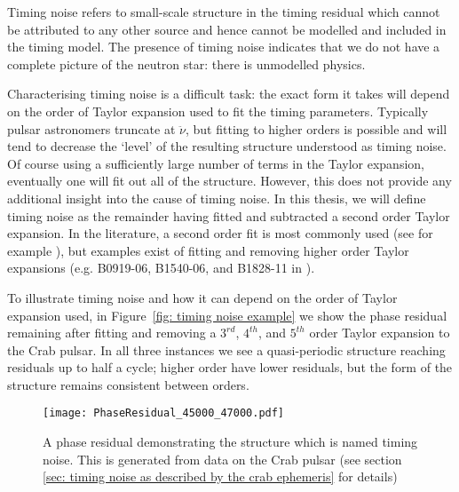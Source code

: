 Timing noise refers to small-scale structure in the timing residual which
cannot be attributed to any other source and hence cannot be modelled and
included in the timing model. The presence of timing noise indicates that we do
not have a complete picture of the neutron star: there is unmodelled physics.

Characterising timing noise is a difficult task: the exact form it takes will
depend on the order of Taylor expansion used to fit the timing parameters.
Typically pulsar astronomers truncate at $\ddot{\nu}$, but fitting to higher
orders is possible and will tend to decrease the `level' of the resulting
structure understood as timing noise. Of course using a sufficiently large
number of terms in the Taylor expansion, eventually one will fit out all of the
structure. However, this does not provide any additional insight into the cause
of timing noise. In this thesis, we will define timing noise as the remainder
having fitted and subtracted a second order Taylor expansion. In the
literature, a second order fit is most commonly used (see for example
\citet{Hobbs2010}), but examples exist of fitting and removing higher order
Taylor expansions (e.g. B0919-06, B1540-06, and B1828-11 in \citet{Lyne2010}).

To illustrate timing noise and how it can depend on the order of Taylor
expansion used, in Figure~\ref{fig: timing noise example} we show the phase
residual remaining after fitting and removing a $3^{rd}$, $4^{th}$, and
$5^{th}$ order Taylor expansion to the Crab pulsar. In all three instances we
see a quasi-periodic structure reaching residuals up to half a cycle; higher
order have lower residuals, but the form of the structure remains consistent
between orders.  \begin{figure}[htb] \centering
\texttt{[image: PhaseResidual\_45000\_47000.pdf]}
\caption{A phase residual demonstrating the structure which is named timing
noise. This is generated from data on the Crab pulsar (see section \ref{sec:
timing noise as described by the crab ephemeris} for details)} \label{fig:
timing noise example} \end{figure}

